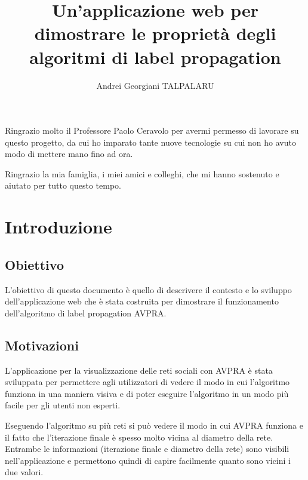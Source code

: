 \documentclass[a4paper,12pt]{report}
\begin{document}

\setcounter{secnumdepth}{5}
\setcounter{tocdepth}{5}

\title{Un'applicazione web per dimostrare le proprietà degli algoritmi di label propagation}
\author{Andrei Georgiani TALPALARU}

\beforepreface
{}
Ringrazio molto il Professore Paolo Ceravolo per avermi permesso di lavorare su questo progetto, da cui ho imparato tante nuove tecnologie su cui non ho avuto modo di mettere mano fino ad ora. 

Ringrazio la mia famiglia, i miei amici e colleghi, che mi hanno sostenuto e aiutato per tutto questo tempo.
\afterpreface
% 
% 
%		
\chapter{Introduzione}

\section{Obiettivo}
L'obiettivo di questo documento è quello di descrivere il contesto e lo sviluppo dell'applicazione web che è stata costruita per dimostrare il funzionamento dell'algoritmo di label propagation AVPRA.

\section{Motivazioni}
L'applicazione per la visualizzazione delle reti sociali con AVPRA è stata sviluppata per permettere agli utilizzatori di vedere il modo in cui l'algoritmo funziona in una maniera visiva e di poter eseguire l'algoritmo in un modo più facile per gli utenti non esperti.

Eseguendo l'algoritmo su più reti si può vedere il modo in cui AVPRA funziona e il fatto che l'iterazione finale è spesso molto vicina al diametro della rete. Entrambe le informazioni (iterazione finale e diametro della rete) sono visibili nell'applicazione e permettono quindi di capire facilmente quanto sono vicini i due valori.

\pagebreak
\end{document}
